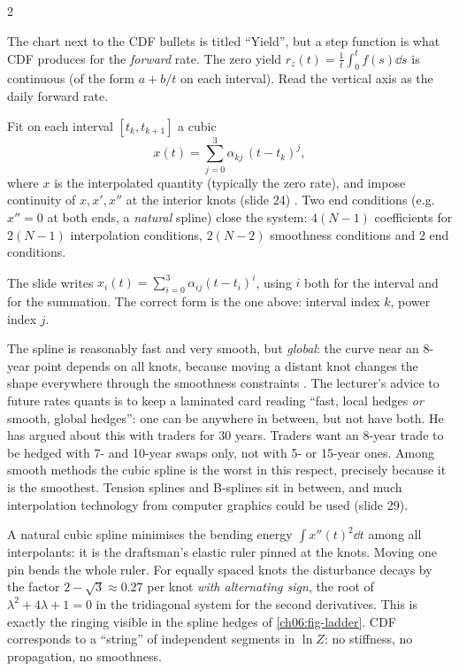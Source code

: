 \begin{paracol}{2}
\begin{coursenote}
The chart next to the CDF bullets is titled ``Yield'', but a step function is what CDF produces for the
\emph{forward} rate. The zero yield $r_z(t)=\frac1t\int_0^tf(s)\dd s$ is continuous (of the form $a+b/t$ on each
interval). Read the vertical axis as the daily forward rate.
\end{coursenote}

\begin{definition}
Fit on each interval $[t_k,t_{k+1}]$ a cubic
\[
  x(t)=\sum_{j=0}^{3}\alpha_{kj}\,(t-t_k)^j ,
\]
where $x$ is the interpolated quantity (typically the zero rate), and impose continuity of $x,x',x''$ at the
interior knots (slide 24) . Two end conditions (e.g.\ $x''=0$ at both ends, a \emph{natural}
spline) close the system: $4(N-1)$ coefficients for $2(N-1)$ interpolation conditions, $2(N-2)$ smoothness
conditions and 2 end conditions.
\end{definition}

\begin{coursenote}
The slide writes $x_i(t)=\sum_{i=0}^{3}\alpha_{ij}(t-t_i)^i$, using $i$ both for the interval and for the
summation. The correct form is the one above: interval index $k$, power index $j$.
\end{coursenote}

The spline is reasonably fast and very smooth, but \emph{global}: the curve near an 8-year point depends on all
knots, because moving a distant knot changes the shape everywhere through the smoothness constraints
. The lecturer's advice to future rates quants is to keep a laminated card reading ``fast, local
hedges \emph{or} smooth, global hedges'': one can be anywhere in between, but not have both. He has argued about
this with traders for 30 years. Traders want an 8-year trade to be hedged with 7- and 10-year swaps only, not with
5- or 15-year ones. Among smooth methods the cubic spline is the worst in this respect, precisely because it is the
smoothest. Tension splines and B-splines sit in between, and much interpolation technology from computer graphics
could be used  (slide 29).

\begin{intuition}
A natural cubic spline minimises the bending energy $\int x''(t)^2\dd t$ among all interpolants: it is the
draftsman's elastic ruler pinned at the knots. Moving one pin bends the whole ruler. For equally spaced knots the
disturbance decays by the factor $2-\sqrt3\approx0.27$ per knot \emph{with alternating sign}, the root of
$\lambda^2+4\lambda+1=0$ in the tridiagonal system for the second derivatives. This is exactly the ringing
visible in the spline hedges of \cref{ch06:fig-ladder}. CDF corresponds to a ``string'' of independent segments
in $\ln Z$: no stiffness, no propagation, no smoothness.
\end{intuition}


\end{paracol}
